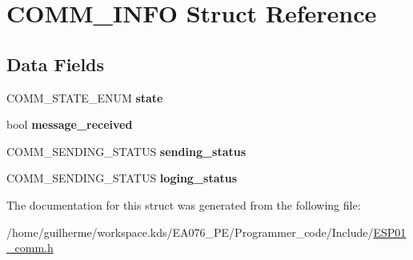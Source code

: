 \hypertarget{struct_c_o_m_m___i_n_f_o}{}\section{C\+O\+M\+M\+\_\+\+I\+N\+FO Struct Reference}
\label{struct_c_o_m_m___i_n_f_o}
\subsection*{Data Fields}
\begin{DoxyCompactItemize}
\item 
\mbox{\label{struct_c_o_m_m___i_n_f_o_a7fbaab04ae614652b8575097778ed476}} 
C\+O\+M\+M\+\_\+\+S\+T\+A\+T\+E\+\_\+\+E\+N\+UM {\bfseries state}
\item 
\mbox{\label{struct_c_o_m_m___i_n_f_o_adcf1f8e48dfeb2b907f289ef36928520}} 
bool {\bfseries message\+\_\+received}
\item 
\mbox{\label{struct_c_o_m_m___i_n_f_o_a90bbbdec239ff43315e2e6d40eac5495}} 
C\+O\+M\+M\+\_\+\+S\+E\+N\+D\+I\+N\+G\+\_\+\+S\+T\+A\+T\+US {\bfseries sending\+\_\+status}
\item 
\mbox{\label{struct_c_o_m_m___i_n_f_o_abd7fc5c715a95a267e8c4f843771eb4e}} 
C\+O\+M\+M\+\_\+\+S\+E\+N\+D\+I\+N\+G\+\_\+\+S\+T\+A\+T\+US {\bfseries loging\+\_\+status}
\end{DoxyCompactItemize}


The documentation for this struct was generated from the following file\+:\begin{DoxyCompactItemize}
\item 
/home/guilherme/workspace.\+kds/\+E\+A076\+\_\+\+P\+E/\+Programmer\+\_\+code/\+Include/\hyperlink{_e_s_p01__comm_8h}{E\+S\+P01\+\_\+comm.\+h}\end{DoxyCompactItemize}
